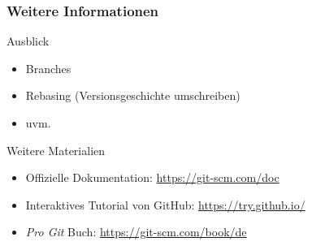 \documentclass[accentcolor=tud8b,colorbacktitle,inverttitle,landscape,german,presentation,t]{tudbeamer}
\begin{document}
			\begin{frame}
				\frametitle{Weitere Informationen}
					\begin{block}{Ausblick}
						\begin{itemize}
							\item Branches
							\item Rebasing (Versionsgeschichte umschreiben)
							\item uvm.
						\end{itemize}
					\end{block}
					\begin{block}{Weitere Materialien}
						\begin{itemize}
							\item Offizielle Dokumentation: \href{https://git-scm.com/doc}{https://git-scm.com/doc}
							\item Interaktives Tutorial von GitHub: \href{https://try.github.io/}{https://try.github.io/}
							\item \textit{Pro Git} Buch: \href{https://git-scm.com/book/de}{https://git-scm.com/book/de}
						\end{itemize}
					\end{block}
			\end{frame}
	
\end{document}
